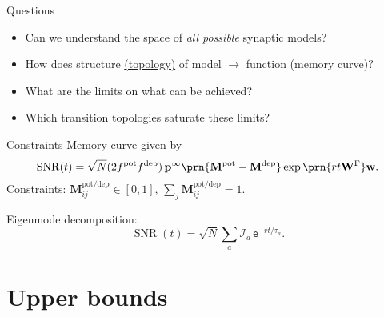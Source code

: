 \documentclass{beamer}%
\DeclareMathOperator{\snr}{SNR}
\newcommand{\pr}{\mathbf{p}}
\newcommand{\eq}{\pr^\infty}
\newcommand{\w}{\mathbf{w}}
\newcommand{\W}{\mathbf{W}}
\newcommand{\frg}{\W^\mathrm{F}}
\newcommand{\M}{\mathbf{M}}
\newcommand{\pot}{^{\text{pot}}}
\newcommand{\dep}{^{\text{dep}}}
\newcommand{\potdep}{^{\text{pot/dep}}}
\newcommand{\initial}{\mathcal{I}}
\renewcommand{\e}{\mathsf{e}}
\begin{document}

\begin{frame}[label=fr_questions]{Questions}
%
 \begin{itemize}
   \item Can we understand the space of \emph{all possible} synaptic models?
   \item How does structure \hyperlink{fr_net<1>}{(topology)} of model $\to$ function (memory curve)?
   \item What are the limits on what can be achieved?
   \item Which transition topologies saturate these limits?
 \end{itemize}
%
\end{frame}


\begin{frame}{Constraints}
%
 Memory curve given by
 \begin{equation*}
   \snr(t) =
      \sqrt{N}(2f\pot f\dep)\,
      \eq \prn{\M\pot-\M\dep}      \exp\prn{rt\frg}\w.
 \end{equation*}
 Constraints: \qquad $\M\potdep_{ij}\in[0,1]$, \qquad $\sum_j\M\potdep_{ij}=1$.

 \vp Eigenmode decomposition:
 \begin{equation*}
   \snr(t) = \sqrt{N}\sum_a \initial_a \,\e^{-rt/\tau_a}.
 \end{equation*}
%
\end{frame}



\section{Upper bounds}

\end{document}
